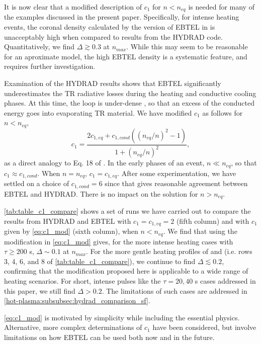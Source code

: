 It is now clear that a modified description of $c_1$ for $n < n_{eq}$ is needed for many of the examples discussed in the present paper. Specifically, for intense heating events, the coronal density calculated by the version of EBTEL in \citet{cargill_enthalpy-based_2012} is unacceptably high when compared to results from the HYDRAD code. Quantitatively, we find $\Delta\gtrsim0.3$ at $n_{max}$. While this may seem to be reasonable for an aproximate model, the high EBTEL density is a systematic feature, and requires further investigation.

Examination of the HYDRAD results shows that EBTEL significantly underestimates the TR radiative losses during the heating and conductive cooling phases. At this time, the loop is under-dense \citep[e.g.][]{cargill_nanoflare_2004}, so that an excess of the conducted energy goes into evaporating TR material. We have modified $c_1$ as follows for $n < n_{eq}$,
\begin{equation}
    c_1 = \frac{2c_{1,eq} + c_{1,cond}((n_{eq}/n)^2-1)}{1+(n_{eq}/n)^2},
    \label{eq:c1_mod}
\end{equation}
as a direct analogy to Eq. 18 of \citet{cargill_enthalpy-based_2012}. In the early phases of an event, $n \ll n_{eq}$, so that $c_1 \approx c_{1,cond}$. When $n = n_{eq}$, $c_1 = c_{1,eq}$. After some experimentation, we have settled on a choice of $c_{1,cond} = 6$ since that gives reasonable agreement between EBTEL and HYDRAD. There is no impact on the solution for $n > n_{eq}$.

\autoref{tab:table_c1_compare} shows a set of runs we have carried out to compare the results from HYDRAD and EBTEL with $c_1=c_{1,eq}=2$ (fifth column) and with $c_1$ given by \autoref{eq:c1_mod} (sixth column), when $n<n_{eq}$. We find that using the modification in \autoref{eq:c1_mod} gives, for the more intense heating cases with $\tau\ge200$ s, $\Delta\sim0.1$ at $n_{max}$. For the more gentle heating profiles of \citet{cargill_enthalpy-based_2012} and \citet{bradshaw_influence_2013} (i.e. rows 3, 4, 6, and 8 of \autoref{tab:table_c1_compare}), we continue to find $\Delta\lesssim0.2$, confirming that the modification proposed here is applicable to a wide range of heating scenarios. For short, intense pulses like the $\tau=20,40$ s cases addressed in this paper, we still find $\Delta>0.2$. The limitations of such cases are addressed in \autoref{hot-plasma:subsubsec:hydrad_comparison_sf}.


\autoref{eq:c1_mod} is motivated by simplicity while including the essential physics. Alternative, more complex determinations of $c_1$ have been considered, but involve limitations on how EBTEL can be used both now and in the future.

